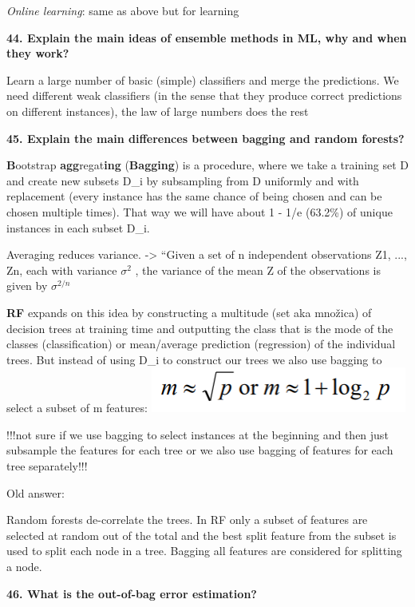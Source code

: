 \textit{Online learning}: same as above but for learning

\textbf{44. Explain the main ideas of ensemble methods in ML, why and
when they work?}

Learn a large number of basic (simple) classifiers and merge the
predictions. We need different weak classifiers (in the sense that they
produce correct predictions on different instances), the law of large
numbers does the rest

\textbf{45. Explain the main differences between bagging and random
forests?}

\textbf{B}ootstrap \textbf{agg}regat\textbf{ing} (\textbf{Bagging}) is a
procedure, where we take a training set D and create new subsets D\_i by
subsampling from D uniformly and with replacement (every instance has
the same chance of being chosen and can be chosen multiple times). That
way we will have about 1 - 1/e (63.2\%) of unique instances in each
subset D\_i.

Averaging reduces variance. -\textgreater{} ``Given a set of n
independent observations Z1, ..., Zn, each with variance $\sigma^2$ , the
variance of the mean Z of the observations is given by
$\sigma^{2/n}$

\textbf{RF} expands on this idea by constructing a multitude (set aka
množica) of decision trees at training time and outputting the class
that is the mode of the classes (classification) or mean/average
prediction (regression) of the individual trees. But instead of using
D\_i to construct our trees we also use bagging to select a subset of m
features:
\includegraphics[width=3.32292in,height=0.58333in]{media/image20.png}

!!!not sure if we use bagging to select instances at the beginning and
then just subsample the features for each tree or we also use bagging of
features for each tree separately!!!

Old answer:

Random forests de-correlate the trees. In RF only a subset of features
are selected at random out of the total and the best split feature from
the subset is used to split each node in a tree. Bagging all features
are considered for splitting a node.

\textbf{46. What is the out-of-bag error estimation?}

